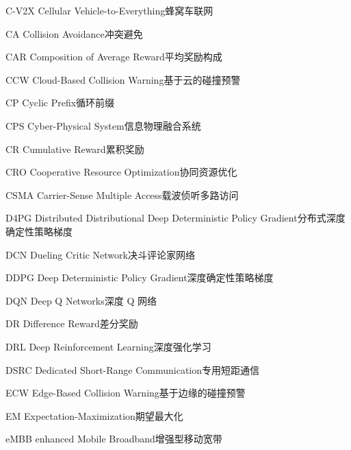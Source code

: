 \begin{abbreviate}[0mm][18mm]
\item[C-V2X] Cellular Vehicle-to-Everything\hspace{1em}蜂窝车联网
\item[CA] Collision Avoidance\hspace{1em}冲突避免
\item[CAR] Composition of Average Reward\hspace{1em}平均奖励构成
\item[CCW] Cloud-Based Collision Warning\hspace{1em}基于云的碰撞预警
\item[CP] Cyclic Prefix\hspace{1em}循环前缀
\item[CPS] Cyber-Physical System\hspace{1em}信息物理融合系统
\item[CR] Cumulative Reward\hspace{1em}累积奖励
\item[CRO] Cooperative Resource Optimization\hspace{1em}协同资源优化
\item[CSMA] Carrier-Sense Multiple Access\hspace{1em}载波侦听多路访问
\item[D4PG] Distributed Distributional Deep Deterministic Policy Gradient\hspace{1em}分布式深度确定性策略梯度
\item[DCN] Dueling Critic Network\hspace{1em}决斗评论家网络
\item[DDPG] Deep Deterministic Policy Gradient\hspace{1em}深度确定性策略梯度
\item[DQN] Deep Q Networks\hspace{1em}深度 Q 网络
\item[DR] Difference Reward\hspace{1em}差分奖励
\item[DRL] Deep Reinforcement Learning\hspace{1em}深度强化学习
\item[DSRC] Dedicated Short-Range Communication\hspace{1em}专用短距通信
\item[ECW] Edge-Based Collision Warning\hspace{1em}基于边缘的碰撞预警
\item[EM] Expectation-Maximization\hspace{1em}期望最大化
\item[eMBB] enhanced Mobile Broadband\hspace{1em}增强型移动宽带

\end{abbreviate}
